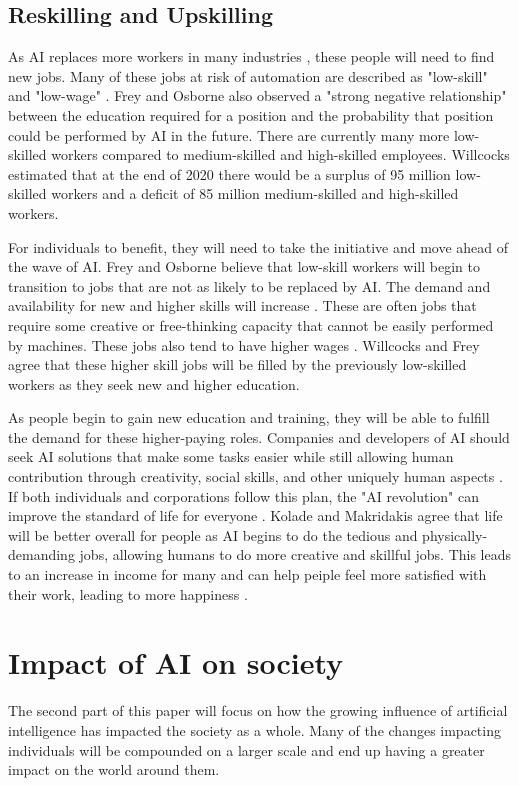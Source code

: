 \documentclass[12pt, man]{apa6}
\begin{document}
\subsection*{Reskilling and Upskilling}
As AI replaces more workers in many industries \parencite{Nguyen2022}, these people will need to find new jobs.  Many of these jobs at risk of automation are described as "low-skill" and "low-wage" \parencite[]{Frey2017}.  Frey and Osborne \parencite*[]{Frey2017} also observed a "strong negative relationship" between the education required for a position and the probability that position could be performed by AI in the future.
There are currently many more low-skilled workers compared to medium-skilled and high-skilled employees.  Willcocks \parencite*[]{Willcocks2020} estimated that at the end of 2020 there would be a surplus of 95 million low-skilled workers and a deficit of 85 million medium-skilled and high-skilled workers.

For individuals to benefit, they will need to take the initiative and move ahead of the wave of AI.  Frey and Osborne \parencite*[]{Frey2017} believe that low-skill workers will begin to transition to jobs that are not as likely to be replaced by AI. The demand and availability for new and higher skills will increase \parencite{Willcocks2020}.  These are often jobs that require some creative or free-thinking capacity that cannot be easily performed by machines.  These jobs also tend to have higher wages \parencite{Frey2017}.  Willcocks and Frey agree that these higher skill jobs will be filled by the previously low-skilled workers as they seek new and higher education.

As people begin to gain new education and training, they will be able to fulfill the demand for these higher-paying roles.  Companies and developers of AI should seek AI solutions that make some tasks easier while still allowing human contribution through creativity, social skills, and other uniquely human aspects \parencite[]{Kolade2022}.  If both individuals and corporations follow this plan, the "AI revolution" can improve the standard of life for everyone \parencite{Makridakis2017}.  Kolade and Makridakis agree that life will be better overall for people as AI begins to do the tedious and physically-demanding jobs, allowing humans to do more creative and skillful jobs.  This leads to an increase in income for many and can help peiple feel more satisfied with their work, leading to more happiness \parencite{Makridakis2017}.

\section*{Impact of AI on society}
The second part of this paper will focus on how the growing influence of artificial intelligence has impacted the society as a whole.  Many of the changes impacting individuals will be compounded on a larger scale and end up having a greater impact on the world around them.
\end{document}
